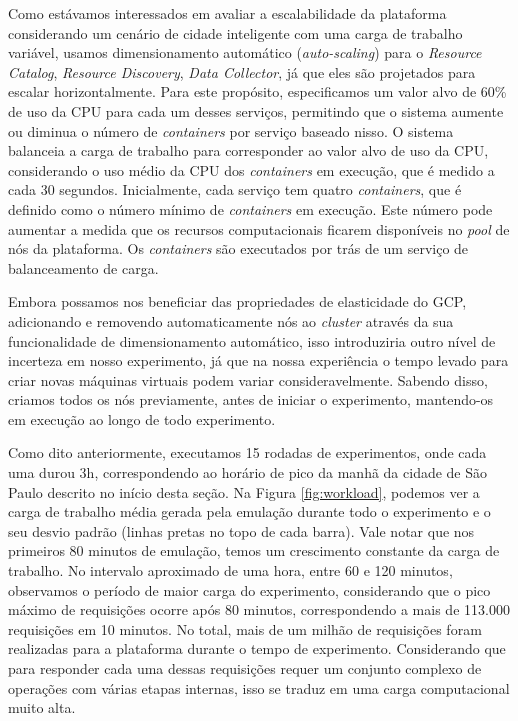 Como estávamos interessados em avaliar a escalabilidade da plataforma considerando um cenário de cidade inteligente com uma carga de trabalho variável, usamos dimensionamento automático
(\textit{auto-scaling}) para o \textit{Resource Catalog}, \textit{Resource Discovery}, \textit{Data Collector}, já que eles são projetados para escalar horizontalmente.
Para este propósito, especificamos um valor alvo de 60\% de uso da CPU para cada um desses serviços, permitindo que o sistema aumente ou diminua o número de \textit{containers} por serviço baseado nisso.
O sistema balanceia a carga de trabalho para corresponder ao valor alvo de uso da CPU, considerando o uso médio da CPU dos \textit{containers} em execução, que é medido a cada 30 segundos.
Inicialmente, cada serviço tem quatro \textit{containers}, que é definido como o número mínimo de \textit{containers} em execução.
Este número pode aumentar a medida que os recursos computacionais ficarem disponíveis no \textit{pool} de nós da plataforma.
Os \textit{containers} são executados por trás de um serviço de balanceamento de carga.

Embora possamos nos beneficiar das propriedades de elasticidade do GCP, adicionando e removendo automaticamente nós ao \textit{cluster} através da sua funcionalidade de dimensionamento automático,
isso introduziria outro nível de incerteza em nosso experimento, já que na nossa experiência o tempo levado para criar novas máquinas virtuais podem variar consideravelmente.
Sabendo disso, criamos todos os nós previamente, antes de iniciar o experimento, mantendo-os em execução ao longo de todo experimento.

Como dito anteriormente, executamos 15 rodadas de experimentos, onde cada uma durou 3h, correspondendo ao horário de pico da manhã da cidade de São Paulo descrito no início desta seção.
Na Figura \ref{fig:workload}, podemos ver a carga de trabalho média gerada pela emulação durante todo o experimento e o seu desvio padrão (linhas pretas no topo de cada barra).
Vale notar que nos primeiros 80 minutos de emulação, temos um crescimento constante da carga de trabalho.
No intervalo aproximado de uma hora, entre 60 e 120 minutos, observamos o período de maior carga do experimento, considerando que o pico máximo de requisições ocorre após 80 minutos, correspondendo a mais
de 113.000 requisições em 10 minutos.
No total, mais de um milhão de requisições foram realizadas para a plataforma durante o tempo de experimento.
Considerando que para responder cada uma dessas requisições requer um conjunto complexo de operações com várias etapas internas, isso se traduz em uma carga computacional muito alta.


